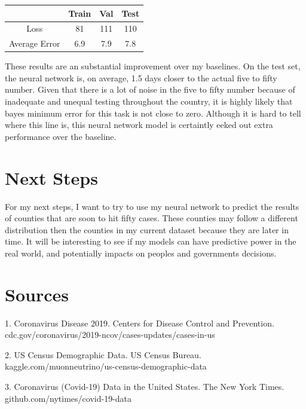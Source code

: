 \documentclass[12pt]{article}
\begin{document}
    \begin{center}
    \begin{tabular}{|c|c|c|c|}

        \hline

        & Train & Val & Test \\ \hline
        Loss & 81 & 111 & 110 \\ \hline
        Average Error & 6.9 & 7.9 & 7.8 \\ \hline

    \end{tabular}
    \end{center}

    These results are an substantial improvement over my baselines. On the test set, the neural network is, on average, 1.5 days closer to the actual five to fifty number. Given that there is a lot of noise in the five to fifty number because of inadequate and unequal testing throughout the country, it is highly likely that bayes minimum error for this task is not close to zero. Although it is hard to tell where this line is, this neural network model is certaintly eeked out extra performance over the baseline.


\section{Next Steps}


    For my next steps, I want to try to use my neural network to predict the results of counties that are soon to hit fifty cases. These counties may follow a different distribution then the counties in my current dataset because they are later in time. It will be interesting to see if my models can have predictive power in the real world, and potentially impacts on peoples and governments decisions.

\section{Sources}

1. Coronavirus Disease 2019. Centers for Disease Control and Prevention. cdc.gov/coronavirus/2019-ncov/cases-updates/cases-in-us

2. US Census Demographic Data. US Census Bureau. kaggle.com/muonneutrino/us-census-demographic-data

3. Coronavirus (Covid-19) Data in the United States. The New York Times. github.com/nytimes/covid-19-data
\end{document}
